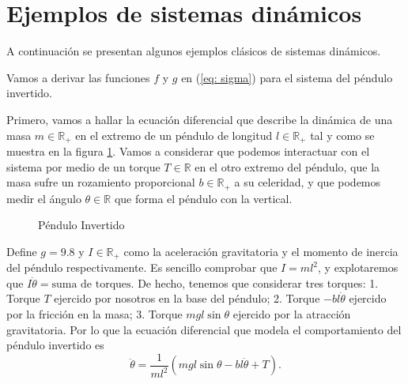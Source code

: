 \section{Ejemplos de sistemas dinámicos}\label{sec: ejem}
A continuación se presentan algunos ejemplos clásicos de sistemas dinámicos.
\begin{example}

Vamos a derivar las funciones $f$ y $g$ en (\ref{eq: sigma}) para el sistema del péndulo invertido.

Primero, vamos a hallar la ecuación diferencial que describe la dinámica de una masa $m\in\mathbb{R}_+$ en el extremo de un péndulo de longitud $l\in\mathbb{R}_+$ tal y como se muestra en la figura \ref{fig: invpen}. Vamos a considerar que podemos interactuar con el sistema por medio de un torque $T\in\mathbb{R}$ en el otro extremo del péndulo, que la masa sufre un rozamiento proporcional $b\in\mathbb{R}_+$ a su celeridad, y que podemos medir el ángulo $\theta\in\mathbb{R}$ que forma el péndulo con la vertical.

\begin{figure}[!h]
\centering
{}
\caption{Péndulo Invertido}
\label{fig: invpen}
\end{figure}

Define $g = 9.8$ y $I\in\mathbb{R}_+$ como la aceleración gravitatoria y el momento de inercia del péndulo respectivamente. Es sencillo comprobar que $I = ml^2$, y explotaremos que $I \ddot\theta = \text{suma de torques}$. De hecho, tenemos que considerar tres torques: 1. Torque $T$ ejercido por nosotros en la base del péndulo; 2. Torque $-bl\dot\theta$ ejercido por la fricción en la masa; 3. Torque $mgl \sin\theta$ ejercido por la atracción gravitatoria. Por lo que la ecuación diferencial que modela el comportamiento del péndulo invertido es
\begin{equation}
\ddot\theta = \frac{1}{ml^2}\left(mgl\sin{\theta}-bl\dot\theta + T\right).
\label{eq: dyn}
\end{equation}


\end{example}
